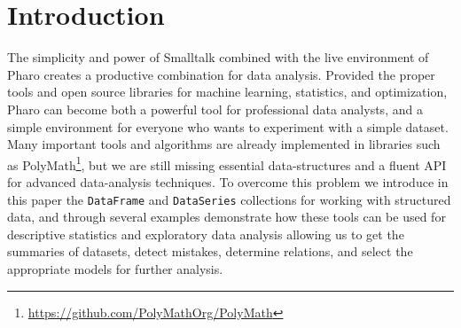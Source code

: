 \documentclass[sigplan]{acmart}
\begin{document}



\maketitle

\section{Introduction}
\label{sec:intro}

%
%
%
%

The simplicity and power of Smalltalk combined with the live environment of Pharo creates a productive combination for data analysis. 
Provided the proper tools and open source libraries for machine learning, statistics, and optimization, Pharo can become both a powerful tool for professional data analysts, and a simple environment for everyone who wants to experiment with a simple dataset. Many important tools and algorithms are already implemented in libraries such as PolyMath\footnote{\url{https://github.com/PolyMathOrg/PolyMath}}, but we are still missing essential data-structures and a fluent API for advanced data-analysis techniques. To overcome this problem we introduce in this paper the \texttt{DataFrame} and \texttt{DataSeries} collections for working with structured data, and through several examples demonstrate how these tools can be used for descriptive statistics and exploratory data analysis allowing us to get the summaries of datasets, detect mistakes, determine relations, and select the appropriate models for further analysis.
\end{document}
